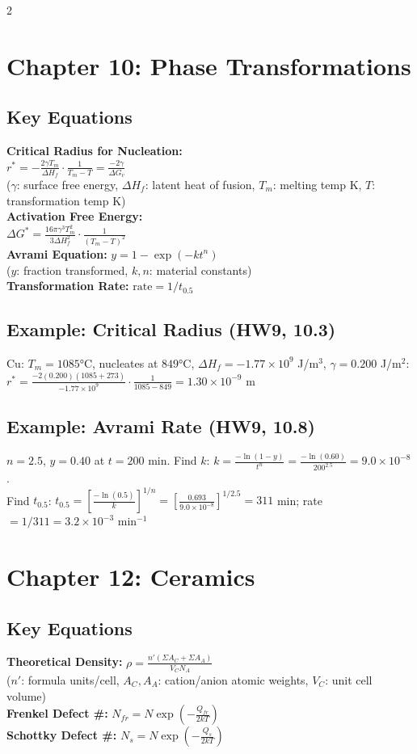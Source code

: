 \documentclass[7pt]{article}
\begin{document}
\begin{multicols*}{2}
\section*{Chapter 10: Phase Transformations}
\subsection*{Key Equations}
\textbf{Critical Radius for Nucleation:} \\
$r^* = -\frac{2\gamma T_m}{\Delta H_f}\cdot\frac{1}{T_m - T} = \frac{-2\gamma}{\Delta G_v}$ \\
($\gamma$: surface free energy, $\Delta H_f$: latent heat of fusion, $T_m$: melting temp K, $T$: transformation temp K) \\
\textbf{Activation Free Energy:} \\
$\Delta G^* = \frac{16\pi\gamma^3 T_m^2}{3\Delta H_f^2}\cdot\frac{1}{(T_m-T)^2}$ \\
\textbf{Avrami Equation:} $y = 1 - \exp(-kt^n)$ \\
($y$: fraction transformed, $k,n$: material constants) \\
\textbf{Transformation Rate:} $\mathrm{rate} = 1/t_{0.5}$
\subsection*{Example: Critical Radius (HW9, 10.3)}
Cu: $T_m=1085$°C, nucleates at $849$°C, $\Delta H_f=-1.77\times10^9$ J/m$^3$, $\gamma=0.200$ J/m$^2$: \\
$r^* = \frac{-2(0.200)(1085+273)}{-1.77\times10^9}\cdot\frac{1}{1085-849} = 1.30\times10^{-9}$ m
\subsection*{Example: Avrami Rate (HW9, 10.8)}
$n=2.5$, $y=0.40$ at $t=200$ min. Find $k$: $k = \frac{-\ln(1-y)}{t^n} = \frac{-\ln(0.60)}{200^{2.5}} = 9.0\times10^{-8}$. \\
Find $t_{0.5}$: $t_{0.5} = \left[\frac{-\ln(0.5)}{k}\right]^{1/n} = \left[\frac{0.693}{9.0\times10^{-8}}\right]^{1/2.5} = 311$ min; rate $= 1/311 = 3.2\times10^{-3}$ min$^{-1}$

\section*{Chapter 12: Ceramics}
\subsection*{Key Equations}
\textbf{Theoretical Density:} $\rho = \frac{n'(\Sigma A_C + \Sigma A_A)}{V_C N_A}$ \\
($n'$: formula units/cell, $A_C,A_A$: cation/anion atomic weights, $V_C$: unit cell volume) \\
\textbf{Frenkel Defect \#:} $N_{fr} = N\exp\!\left(-\frac{Q_{fr}}{2kT}\right)$ \\
\textbf{Schottky Defect \#:} $N_s = N\exp\!\left(-\frac{Q_s}{2kT}\right)$

\end{multicols*}
\end{document}
